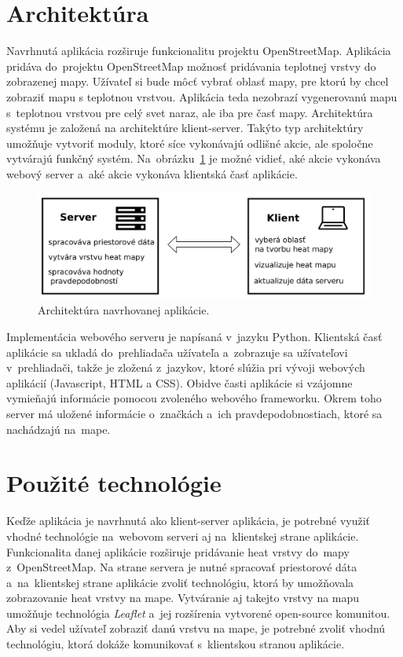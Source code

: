 \section{Architektúra}
Navrhnutá aplikácia rozširuje funkcionalitu projektu OpenStreetMap. Aplikácia pridáva do~projektu OpenStreetMap možnosť pridávania teplotnej vrstvy do zobrazenej mapy. Užívateľ si bude môcť vybrať oblasť mapy, pre ktorú by chcel zobraziť mapu s teplotnou vrstvou. Aplikácia teda nezobrazí vygenerovanú mapu s~teplotnou vrstvou pre celý svet naraz, ale iba pre časť mapy. Architektúra systému je založená na architektúre klient-server. Takýto typ architektúry umožňuje vytvoriť moduly, ktoré síce vykonávajú odlišné akcie, ale spoločne vytvárajú funkčný systém. Na~obrázku~\ref{fig:architecture} je možné vidieť, aké akcie vykonáva webový server a~aké akcie vykonáva klientská časť aplikácie.

\begin{figure}[ht]
    \centering
    \includegraphics[width=0.95\linewidth]{obrazky-figures/architecture.pdf}
    \caption{Architektúra navrhovanej aplikácie.}
    \label{fig:architecture}
\end{figure}

Implementácia webového serveru je napísaná v~jazyku Python. Klientská časť aplikácie sa ukladá do~prehliadača užívateľa a~zobrazuje sa užívateľovi v~prehliadači, takže je zložená z~jazykov, ktoré slúžia pri vývoji webových aplikácií (Javascript, HTML a CSS). Obidve časti aplikácie si vzájomne vymieňajú informácie pomocou zvoleného webového frameworku. Okrem toho server má uložené informácie o~značkách a~ich pravdepodobnostiach, ktoré sa nachádzajú na~mape.


\section{Použité technológie}
Keďže aplikácia je navrhnutá ako klient-server aplikácia, je potrebné využiť vhodné technológie na~webovom serveri aj na~klientskej strane aplikácie. Funkcionalita danej aplikácie rozširuje pridávanie heat vrstvy do~mapy z~OpenStreetMap. Na strane servera je nutné spracovať priestorové dáta a~na~klientskej strane aplikácie zvoliť technológiu, ktorá by umožňovala zobrazovanie heat vrstvy na mape. Vytváranie aj takejto vrstvy na mapu umožňuje technológia \emph{Leaflet} a~jej rozšírenia vytvorené open-source komunitou. Aby si vedel užívateľ zobraziť danú vrstvu na mape, je potrebné zvoliť vhodnú technológiu, ktorá dokáže komunikovať s~klientskou stranou aplikácie. 


